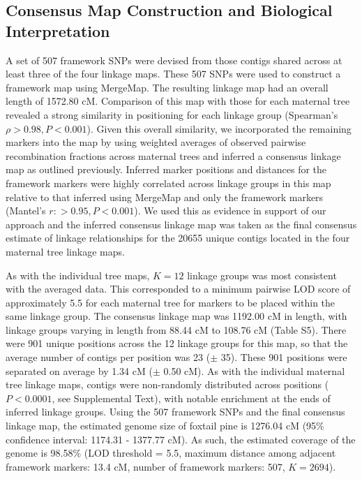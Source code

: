 \documentclass[smallextended]{svjour3}
\begin{document}
\subsection*{Consensus Map Construction and Biological Interpretation}

A set of 507 framework SNPs were devised from those contigs shared across at least three of the four linkage maps. These 507 SNPs were used to construct
a framework map using MergeMap. The resulting linkage map had an overall length of 1572.80 cM. Comparison of this map with those for
each maternal tree revealed a strong similarity in positioning for each linkage group (Spearman's $\rho > 0.98, P < 0.001$). 
Given this overall similarity, we incorporated the remaining markers into the map by using weighted averages of observed pairwise recombination 
fractions across maternal trees and inferred a consensus linkage map as outlined previously. Inferred marker positions and distances 
for the framework markers were highly correlated across linkage groups in this map relative
to that inferred using MergeMap and only the framework markers (Mantel's $r: > 0.95, P < 0.001$). We used this as evidence in support of our approach and the
inferred consensus linkage map was taken as the final consensus estimate of linkage relationships for the \num{20655} unique contigs
located in the four maternal tree linkage maps.

As with the individual tree maps, $K = 12$ linkage groups was most consistent with the averaged data. This corresponded to a minimum pairwise 
LOD score of approximately 5.5 for each maternal tree for markers to be placed within the same linkage group.
The consensus linkage map was 1192.00 cM in length, with linkage groups varying in length from 88.44 cM to 108.76 cM (Table S5). There were 901 unique positions
across the 12 linkage groups for this map, so that the average number of contigs per position was 23 ($\pm$ 35). These 901 positions
were separated on average by 1.34 cM ($\pm$ 0.50 cM). As with the individual maternal tree linkage maps, contigs were non-randomly distributed 
across positions ($P < 0.0001$, see Supplemental Text), with notable enrichment at the ends of inferred linkage groups. Using the 507 framework SNPs and the final consensus linkage map, 
the estimated genome size of foxtail pine is 1276.04 cM (95\% confidence interval: 1174.31 - 1377.77 cM). As such, the estimated coverage of the genome 
is 98.58\% (LOD threshold = 5.5, maximum distance among adjacent framework markers: 13.4 cM, number of framework markers: 507, $K = 2694$). 
\end{document}
